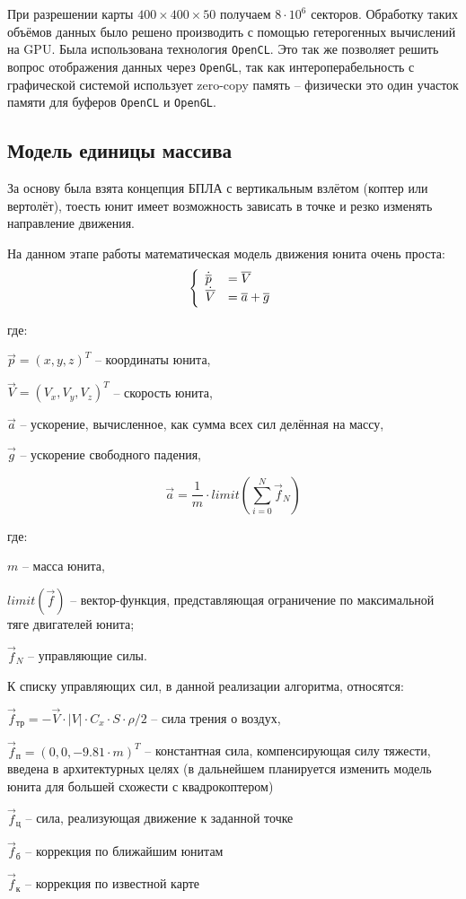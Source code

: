 При разрешении карты $400 \times 400 \times 50$ получаем $8 \cdot 10^6$ секторов.
Обработку таких объёмов данных было решено производить с помощью гетерогенных 
вычислений на GPU. Была использована технология \verb|OpenCL|. Это так же 
позволяет решить вопрос отображения данных через \verb|OpenGL|, так как
интероперабельность с графической системой использует zero-copy память -- 
физически это один участок памяти для буферов \verb|OpenCL| и \verb|OpenGL|.

\newpage
\subsection{Модель единицы массива}

За основу была взята концепция БПЛА с вертикальным взлётом (коптер или вертолёт),
тоесть юнит имеет возможность зависать в точке и резко изменять направление движения.

На данном этапе работы математическая модель движения юнита очень проста:
$$
\left\{
    \begin{array}{l l}
    \dot{\vec{p}}  & = \vec V \\
    \dot{\vec{V}}  & = \vec a + \vec g
    \end{array}
\right.
$$

где:

$\vec p = (x,y,z)^T$ -- координаты юнита,

$\vec V = (V_x,V_y,V_z)^T$ -- скорость юнита,

$\vec a$ -- ускорение, вычисленное, как сумма всех сил делённая на массу,

$\vec g$ -- ускорение свободного падения,

$$ \vec a = \frac{1}{m} \cdot limit \left( \sum_{i=0}^N \vec f_N \right) $$

где:

$m$ -- масса юнита,

$limit \left( \vec f \right)$ -- вектор-функция, представляющая ограничение
по максимальной тяге двигателей юнита;

$\vec f_N$ -- управляющие силы.

К списку управляющих сил, в данной реализации алгоритма, относятся: 
\vspace{-0.5em}
\begin{mintemize}
    \item $\vec f_{\text{тр}} = -\vec V \cdot |V| \cdot C_x \cdot S \cdot \rho / 2$ -- сила трения о воздух,

    \item $\vec f_{\text{п}} = (0,0,-9.81 \cdot m)^T$ -- константная сила, компенсирующая силу тяжести,
        введена в архитектурных целях (в дальнейшем планируется изменить модель юнита
        для большей схожести с квадрокоптером)

    \item $\vec f_{\text{ц}}$ -- сила, реализующая движение к заданной точке
    \item $\vec f_{\text{б}}$ -- коррекция по ближайшим юнитам
    \item $\vec f_{\text{к}}$ -- коррекция по известной карте
\end{mintemize}

